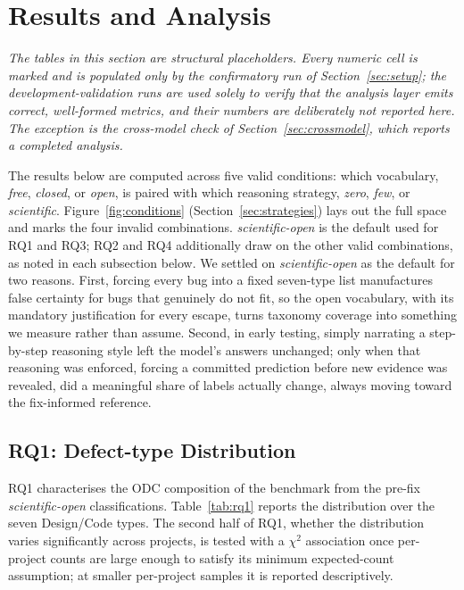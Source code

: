 \section{Results and Analysis}
\label{sec:results}

\noindent\emph{The tables in this section are structural placeholders. Every
numeric cell is marked \TBD{} and is populated only by the confirmatory run of
Section~\ref{sec:setup}; the development-validation runs are used solely to verify
that the analysis layer emits correct, well-formed metrics, and their numbers are
deliberately not reported here. The exception is the cross-model check of
Section~\ref{sec:crossmodel}, which reports a completed analysis.}

The results below are computed across five valid conditions: which vocabulary,
\textit{free}, \textit{closed}, or \textit{open}, is paired with which
reasoning strategy, \textit{zero}, \textit{few}, or \textit{scientific}.
Figure~\ref{fig:conditions} (Section~\ref{sec:strategies}) lays out the full
space and marks the four invalid combinations. \textit{scientific-open} is the
default used for RQ1 and RQ3; RQ2 and RQ4 additionally draw on the other
valid combinations, as noted in each subsection below. We settled on
\textit{scientific-open} as the default for two reasons. First, forcing every
bug into a fixed seven-type list manufactures false certainty for bugs that
genuinely do not fit, so the open vocabulary, with its mandatory justification
for every escape, turns taxonomy coverage into something we measure rather than
assume. Second, in early testing, simply narrating a step-by-step reasoning
style left the model's answers unchanged; only when that reasoning was
enforced, forcing a committed prediction before new evidence was revealed, did
a meaningful share of labels actually change, always moving toward the
fix-informed reference.

\subsection{RQ1: Defect-type Distribution}

RQ1 characterises the ODC composition of the benchmark from the pre-fix
\textit{scientific-open} classifications. Table~\ref{tab:rq1} reports the
distribution over the seven Design/Code types. The second half of RQ1, whether
the distribution varies significantly across projects, is tested with a
$\chi^2$ association once per-project counts are large enough to satisfy its
minimum expected-count assumption; at smaller per-project samples it is reported
descriptively.

